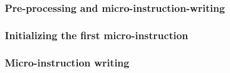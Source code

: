 \subsubsection{Pre-processing and micro-instruction-writing}          \label{mmu: instructions: blake: preprocessing and micro instruction writing}     
\subsubsection{Initializing the first micro-instruction}              \label{mmu: instructions: blake: initialization}                                  
\subsubsection{Micro-instruction writing}                             \label{mmu: instructions: blake: micro instruction writing}                       
